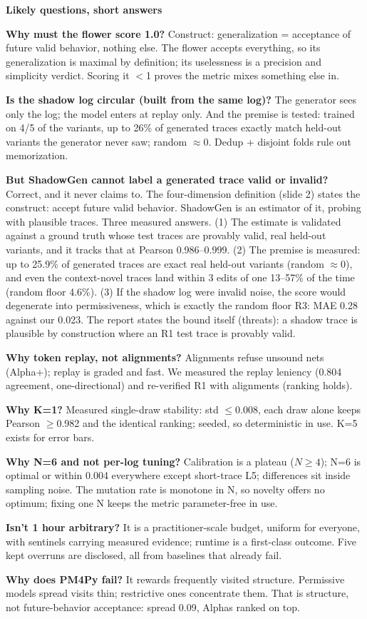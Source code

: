 \documentclass[10pt]{article}
\newcommand{\hdr}[1]{\vspace{5pt}\noindent\textcolor{hd}{\textbf{\large #1}}\par\vspace{2pt}}
\newcommand{\kv}[2]{\noindent\textbf{#1} #2\par}
\begin{document}
\hdr{Likely questions, short answers}
\kv{Why must the flower score 1.0?}{Construct: generalization = acceptance of future valid behavior, nothing else. The flower accepts everything, so its generalization is maximal by definition; its uselessness is a precision and simplicity verdict. Scoring it $<$1 proves the metric mixes something else in.}
\kv{Is the shadow log circular (built from the same log)?}{The generator sees only the log; the model enters at replay only. And the premise is tested: trained on 4/5 of the variants, up to 26\% of generated traces exactly match held-out variants the generator never saw; random $\approx$0. Dedup + disjoint folds rule out memorization.}
\kv{But ShadowGen cannot label a generated trace valid or invalid?}{Correct, and it never claims to. The four-dimension definition (slide 2) states the construct: accept future valid behavior. ShadowGen is an estimator of it, probing with plausible traces. Three measured answers. (1) The estimate is validated against a ground truth whose test traces are provably valid, real held-out variants, and it tracks that at Pearson 0.986--0.999. (2) The premise is measured: up to 25.9\% of generated traces are exact real held-out variants (random $\approx$0), and even the context-novel traces land within 3 edits of one 13--57\% of the time (random floor 4.6\%). (3) If the shadow log were invalid noise, the score would degenerate into permissiveness, which is exactly the random floor R3: MAE 0.28 against our 0.023. The report states the bound itself (threats): a shadow trace is plausible by construction where an R1 test trace is provably valid.}
\kv{Why token replay, not alignments?}{Alignments refuse unsound nets (Alpha+); replay is graded and fast. We measured the replay leniency (0.804 agreement, one-directional) and re-verified R1 with alignments (ranking holds).}
\kv{Why K=1?}{Measured single-draw stability: std $\le$0.008, each draw alone keeps Pearson $\ge$0.982 and the identical ranking; seeded, so deterministic in use. K=5 exists for error bars.}
\kv{Why N=6 and not per-log tuning?}{Calibration is a plateau ($N\ge4$); N=6 is optimal or within 0.004 everywhere except short-trace L5; differences sit inside sampling noise. The mutation rate is monotone in N, so novelty offers no optimum; fixing one N keeps the metric parameter-free in use.}
\kv{Isn't 1 hour arbitrary?}{It is a practitioner-scale budget, uniform for everyone, with sentinels carrying measured evidence; runtime is a first-class outcome. Five kept overruns are disclosed, all from baselines that already fail.}
\kv{Why does PM4Py fail?}{It rewards frequently visited structure. Permissive models spread visits thin; restrictive ones concentrate them. That is structure, not future-behavior acceptance: spread 0.09, Alphas ranked on top.}
\end{document}
